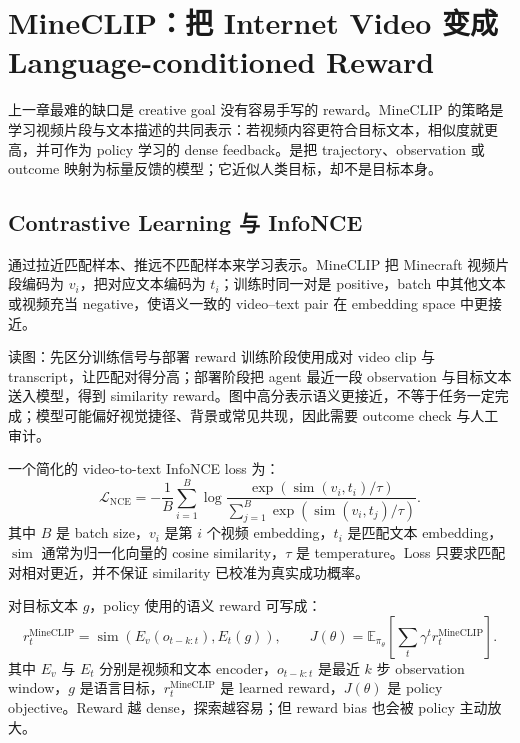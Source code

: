 \section{MineCLIP：把 Internet Video 变成 Language-conditioned Reward}

上一章最难的缺口是 creative goal 没有容易手写的 reward。MineCLIP 的策略是学习视频片段与文本描述的共同表示：若视频内容更符合目标文本，相似度就更高，并可作为 policy 学习的 dense feedback。是把 trajectory、observation 或 outcome 映射为标量反馈的模型；它近似人类目标，却不是目标本身。

\subsection{Contrastive Learning 与 InfoNCE}

通过拉近匹配样本、推远不匹配样本来学习表示。MineCLIP 把 Minecraft 视频片段编码为 $v_i$，把对应文本编码为 $t_i$；训练时同一对是 positive，batch 中其他文本或视频充当 negative，使语义一致的 video--text pair 在 embedding space 中更接近。


\begin{knowledgebox}{读图：先区分训练信号与部署 reward}
训练阶段使用成对 video clip 与 transcript，让匹配对得分高；部署阶段把 agent 最近一段 observation 与目标文本送入模型，得到 similarity reward。图中高分表示语义更接近，不等于任务一定完成；模型可能偏好视觉捷径、背景或常见共现，因此需要 outcome check 与人工审计。
\end{knowledgebox}

一个简化的 video-to-text InfoNCE loss 为：
\[
\mathcal{L}_{\mathrm{NCE}}
=-\frac{1}{B}\sum_{i=1}^{B}
\log\frac{\exp(\operatorname{sim}(v_i,t_i)/\tau)}
{\sum_{j=1}^{B}\exp(\operatorname{sim}(v_i,t_j)/\tau)}.
\]
其中 $B$ 是 batch size，$v_i$ 是第 $i$ 个视频 embedding，$t_i$ 是匹配文本 embedding，$\operatorname{sim}$ 通常为归一化向量的 cosine similarity，$\tau$ 是 temperature。Loss 只要求匹配对相对更近，并不保证 similarity 已校准为真实成功概率。

对目标文本 $g$，policy 使用的语义 reward 可写成：
\[
r_t^{\text{MineCLIP}}=\operatorname{sim}\!\left(E_v(o_{t-k:t}),E_t(g)\right),
\qquad
J(\theta)=\mathbb{E}_{\pi_\theta}\left[\sum_t\gamma^t r_t^{\text{MineCLIP}}\right].
\]
其中 $E_v$ 与 $E_t$ 分别是视频和文本 encoder，$o_{t-k:t}$ 是最近 $k$ 步 observation window，$g$ 是语言目标，$r_t^{\text{MineCLIP}}$ 是 learned reward，$J(\theta)$ 是 policy objective。Reward 越 dense，探索越容易；但 reward bias 也会被 policy 主动放大。

